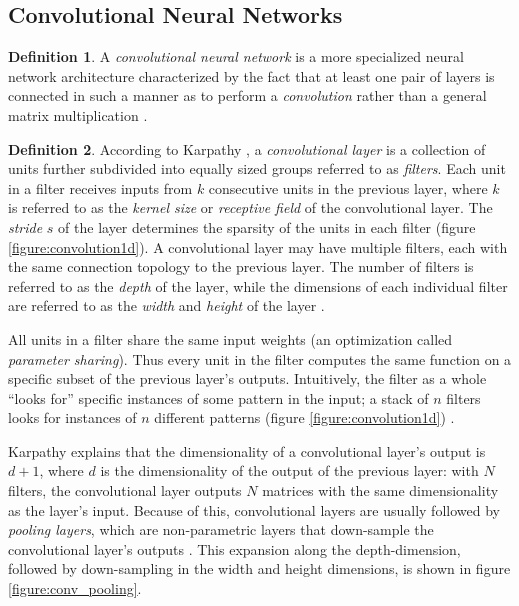 \documentclass[12pt, titlepage]{report}
\theoremstyle{definition}
\newtheorem{definition}{Definition}
\begin{document}
\subsection{Convolutional Neural Networks}\label{subsection:convolutional}
\begin{definition}
A \emph{convolutional neural network} is a more specialized neural network architecture characterized by the fact that at least one pair of layers is connected in such a manner as to perform a \textit{convolution} rather than a general matrix multiplication \cite[p. 326]{goodfellow2016deep}.
\end{definition}

\begin{definition}
According to Karpathy \cite{karpathy2017cs231n}, a \emph{convolutional layer} is a collection of units further subdivided into equally sized groups referred to as \emph{filters}. Each unit in a filter receives inputs from $k$ consecutive units in the previous layer, where $k$ is referred to as the \emph{kernel size} or \emph{receptive field} of the convolutional layer. The \emph{stride} $s$ of the layer determines the sparsity of the units in each filter (figure \ref{figure:convolution1d}). A convolutional layer may have multiple filters, each with the same connection topology to the previous layer. The number of filters is referred to as the \emph{depth} of the layer, while the dimensions of each individual filter are referred to as the \emph{width} and \emph{height} of the layer \cite[Convolutional Neural Networks: Architectures, Convolution / Pooling Layers]{karpathy2017cs231n}.
\end{definition}

All units in a filter share the same input weights (an optimization called \emph{parameter sharing}). Thus every unit in the filter computes the same function on a specific subset of the previous layer's outputs. Intuitively, the filter as a whole ``looks for'' specific instances of some pattern in the input; a stack of $n$ filters looks for instances of $n$ different patterns (figure \ref{figure:convolution1d}) \cite[Convolutional Neural Networks: Architectures, Convolution / Pooling Layers]{karpathy2017cs231n}.

Karpathy explains that the dimensionality of a convolutional layer's output is $d + 1$, where $d$ is the dimensionality of the output of the previous layer: with $N$ filters, the convolutional layer outputs $N$ matrices with the same dimensionality as the layer's input. Because of this, convolutional layers are usually followed by \emph{pooling layers}, which are non-parametric layers that down-sample the convolutional layer's outputs \cite[Convolutional Neural Networks: Architectures, Convolution / Pooling Layers]{karpathy2017cs231n}. This expansion along the depth-dimension, followed by down-sampling in the width and height dimensions, is shown in figure \ref{figure:conv_pooling}.
\end{document}
